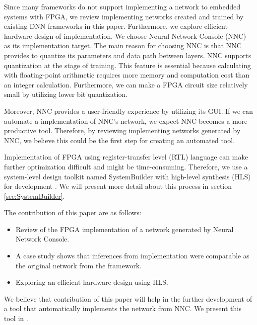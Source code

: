 Since many frameworks do not support implementing a network to embedded systems with FPGA, we review implementing networks created and trained by existing DNN frameworks in this paper. Furthermore, we explore efficient hardware design of implementation. We choose Neural Network Console (NNC) as its implementation target. The main reason for choosing NNC is that NNC provides to quantize its parameters and data path between layers. NNC supports quantization at the stage of training. This feature is essential because calculating with floating-point arithmetic requires more memory and computation cost than an integer calculation. Furthermore, we can make a FPGA circuit size relatively small by utilizing lower bit quantization.

Moreover, NNC provides a user-friendly experience by utilizing its GUI. If we can automate a implementation of NNC's network, we expect NNC becomes a more productive tool. Therefore, by reviewing implementing networks generated by NNC, we believe this could be the first step for creating an automated tool.



Implementation of FPGA using register-transfer level (RTL) language can make further optimization difficult and might be time-consuming. Therefore, we use a system-level design toolkit named SystemBuilder with high-level synthesis (HLS) for development \cite{honda2005systembuilder,honda2007rtos}. We will present more detail about this process in section \ref{sec:SystemBuilder}.

The contribution of this paper are as follows:
\begin{itemize}
    \item Review of the FPGA implementation of a network generated by Neural Network Console.
    \item A case study shows that inferences from implementation were comparable as the original network from the framework.
    \item Exploring an efficient hardware design using HLS.
\end{itemize}

We believe that contribution of this paper will help in the further development of a tool that automatically implements the network from NNC. We present this tool in .

